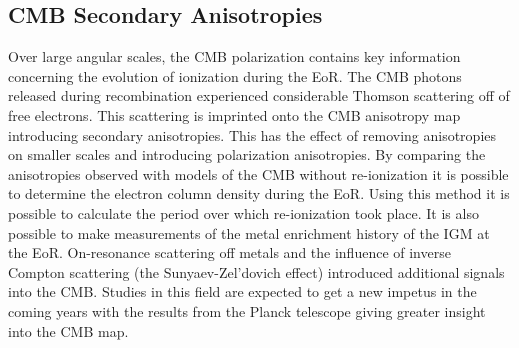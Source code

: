 
\subsection{CMB Secondary Anisotropies} %
\label{sub:cmb_secondary_anisotropies}
	Over large angular scales, the CMB polarization contains key information concerning the evolution of ionization during the EoR. The CMB photons released during recombination experienced considerable Thomson scattering off of free electrons. This scattering is imprinted onto the CMB anisotropy map introducing secondary anisotropies. This has the effect of removing anisotropies on smaller scales and introducing polarization anisotropies. By comparing the anisotropies observed with models of the CMB without re-ionization it is possible to determine the electron column density during the EoR. Using this method it is possible to calculate the period over which re-ionization took place. It is also possible to make measurements of the metal enrichment history of the IGM at the EoR. On-resonance scattering off metals and the influence of inverse Compton scattering (the Sunyaev-Zel'dovich effect) introduced additional signals into the CMB\cite{Monteagudo2006}. Studies in this field are expected to get a new impetus in the coming years with the results from the Planck telescope giving greater insight into the CMB map.
